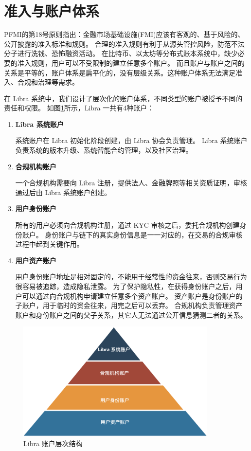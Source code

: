 \section{准入与账户体系}\label{sec:hierarchy}

PFMI的第18号原则指出：金融市场基础设施(FMI)应该有客观的、基于风险的、公开披露的准入标准和规则。
合理的准入规则有利于从源头管控风险，防范不法分子进行洗钱、恐怖融资活动。
在比特币、以太坊等分布式账本系统中，缺少必要的准入规则，用户可以不受限制的建立任意多个账户。
而且账户与账户之间的关系是平等的，账户体系是扁平化的，没有层级关系。这种账户体系无法满足准入、合规和治理等需求。

在 Libra 系统中，我们设计了层次化的账户体系，不同类型的账户被授予不同的责任和权限。
如图\ref{fig:hierarchy}所示，Libra 一共有4种账户：
\begin{enumerate}
    \item \textbf{Libra 系统账户}

        系统账户在 Libra 初始化阶段创建，由 Libra 协会负责管理。
        Libra 系统账户负责系统的版本升级、系统智能合约管理，以及社区治理。
        
    \item \textbf{合规机构账户}

        一个合规机构需要向 Libra 注册，提供法人、金融牌照等相关资质证明，审核通过后由 Libra 系统账户创建。

    \item \textbf{用户身份账户}

        所有的用户必须向合规机构注册，通过 KYC 审核之后，委托合规机构创建身份账户。
        身份账户与链下的真实身份信息是一一对应的，在交易的合规审核过程中起到关键作用。
    
    \item \textbf{用户资产账户}

        用户身份账户地址是相对固定的，不能用于经常性的资金往来，否则交易行为很容易被追踪，造成隐私泄露。
        为了保护隐私性，在获得身份账户之后，用户可以通过向合规机构申请建立任意多个资产账户。
        资产账户是身份账户的子账户，用于临时的资金往来，用完之后可以丢弃。
        合规机构负责管理资产账户和身份账户之间的父子关系，其它人无法通过公开信息猜测二者的关系。

\end{enumerate}
\begin{figure}[h!]
    \centering
    \includegraphics[width=10cm, keepaspectratio]{images/ledger_hierarchy.png}
    \caption{Libra 账户层次结构}
    \label{fig:hierarchy}
\end{figure}

